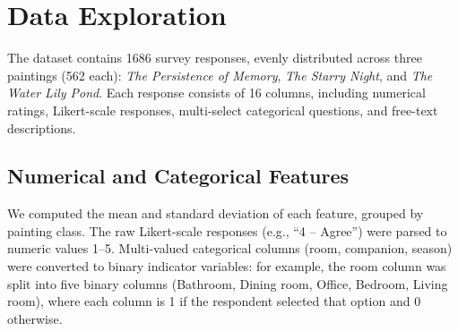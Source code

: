 \documentclass[12pt]{article}
\begin{document}
\begin{titlepage}
    \centering
    \vspace*{3cm}

    {\Large {CSC311: Introduction to Machine Learning \par}
    \vspace{1cm}

    {\Large {Project Report \par}
    \vspace{1cm}

    {\large \textit{Painting Classifier} \par}
    \vspace{3cm}

    {\large Submitted by \par}

    \vspace{0.5cm}
    {\large Thanh Nguyen, Justin Long, Shengdi Zhu, Yash Khanchandani \par}
    \vfill
    {\large University of Toronto\\Winter 2026\par}
\end{titlepage}
\clearpage
\setcounter{page}{1}

\section{Data Exploration}

The dataset contains 1686 survey responses, evenly distributed across three paintings (562 each): \textit{The Persistence of Memory}, \textit{The Starry Night}, and \textit{The Water Lily Pond}. Each response consists of 16 columns, including numerical ratings, Likert-scale responses, multi-select categorical questions, and free-text descriptions.

\subsection*{Numerical and Categorical Features}

We computed the mean and standard deviation of each feature, grouped by painting class. The raw Likert-scale responses (e.g., ``4 -- Agree'') were parsed to numeric values 1--5. Multi-valued categorical columns (room, companion, season) were converted to binary indicator variables: for example, the room column was split into five binary columns (Bathroom, Dining room, Office, Bedroom, Living room), where each column is 1 if the respondent selected that option and 0 otherwise.
\end{document}
